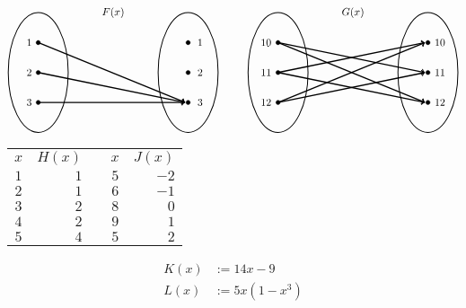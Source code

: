 \documentclass[11pt,letterpaper]{article}
\begin{document}
	\[
	\begin{tikzpicture}
	\node at (2.5,2) {$F(x)$};
	\draw[line width=0.03cm] (0,0) circle (1 and 2);
	\draw[line width=0.03cm] (5,0) circle (1 and 2);
	
	\draw[fill=black] (0,1) circle (0.07);
	\draw[fill=black] (0,0) circle (0.07);
	\draw[fill=black] (0,-1) circle (0.07);
	
	\draw[fill=black] (5,1) circle (0.07);
	\draw[fill=black] (5,0) circle (0.07);
	\draw[fill=black] (5,-1) circle (0.07);
	
	\draw[line width=0.04cm,->] (0,1) -- (4.9,-1);
	\draw[line width=0.04cm,->] (0,0) -- (4.9,-1);
	\draw[line width=0.04cm,->] (0,-1) -- (4.9,-1);
	
	\node at (-0.3,1) {$1$};
	\node at (-0.3,0) {$2$};
	\node at (-0.3,-1) {$3$};
	
	\node at (5.4,1) {$1$};
	\node at (5.4,0) {$2$};
	\node at (5.4,-1) {$3$};
	
	\tikzset{shift={(8,0)}}
	\node at (2.5,2) {$G(x)$};
	
	\draw[line width=0.03cm] (0,0) circle (1 and 2);
	\draw[line width=0.03cm] (5,0) circle (1 and 2);
	
	\draw[fill=black] (0,1) circle (0.07);
	\draw[fill=black] (0,0) circle (0.07);
	\draw[fill=black] (0,-1) circle (0.07);
	
	\draw[fill=black] (5,1) circle (0.07);
	\draw[fill=black] (5,0) circle (0.07);
	\draw[fill=black] (5,-1) circle (0.07);
	
	\draw[line width=0.04cm,->] (0,1) -- (4.9,0);
	\draw[line width=0.04cm,->] (0,1) -- (4.9,-1);
	\draw[line width=0.04cm,->] (0,0) -- (4.9,1);
	\draw[line width=0.04cm,->] (0,0) -- (4.9,-1);
	\draw[line width=0.04cm,->] (0,-1) -- (4.9,1);
	\draw[line width=0.04cm,->] (0,-1) -- (4.9,0);
	
	\node at (-0.4,1) {$10$};
	\node at (-0.4,0) {$11$};
	\node at (-0.4,-1) {$12$};
	
	\node at (5.4,1) {$10$};
	\node at (5.4,0) {$11$};
	\node at (5.4,-1) {$12$};
	\end{tikzpicture}
	\] \pspace

	\begin{minipage}[b]{0.49\textwidth}
	\centering
	\begin{tabular}{c|rcc|r}
	$x$ & $H(x)$ & \hspace{1cm} & $x$ & $J(x)$ \\ \cline{1-2} \cline{4-5}
	$1$ & $1$ & & $5$ & $-2$ \\
	$2$ & $1$ & & $6$ & $-1$ \\
	$3$ & $2$ & & $8$ & $0$ \\
	$4$ & $2$ & & $9$ & $1$ \\
	$5$ & $4$ & & $5$ & $2$
	\end{tabular}
	\end{minipage}
	\begin{minipage}[b]{0.49\textwidth}
	\[
	\begin{aligned}
	K(x)&:= 14x - 9 \\[0.6cm]
	L(x)&:= 5x(1 - x^3)
	\end{aligned}
	\]
	\end{minipage} \pvspace{0.6cm}
	
\end{document}
